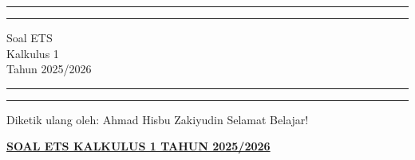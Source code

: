 \documentclass[10pt,openany,a4paper]{article}
\theoremstyle{definition}
\theoremstyle{definition}
\theoremstyle{plain}
\begin{document}
\begin{titlepage}
	\centering %
	\vspace*{1.5\baselineskip} %

	\rule{13cm}{1.6pt}\vspace*{-\baselineskip}\vspace*{2pt} %
	\rule{13cm}{0.4pt} %
	
		\vspace{0.75\baselineskip} %
	{	\Huge Soal ETS\\ 
			\vspace{4mm}
		Kalkulus 1 \\ \vspace{2mm} \huge{Tahun 2025/2026}\\	}
		\vspace{0.75\baselineskip} %
	\rule{13cm}{0.4pt}\vspace*{-\baselineskip}\vspace{3.2pt} %
	\rule{13cm}{1.6pt} %
	
		\vspace{1.75\baselineskip} %
{\large Diketik ulang oleh: Ahmad Hisbu Zakiyudin}
	\vfill
	\vspace{1mm}
\huge{Selamat Belajar!}
\end{titlepage}
\makeatletter
\setlength\fboxsep{3pt}
\setlength{\headheight}{24pt}
 \begin{center}
	{\underline{\textbf{\MakeUppercase{Soal ETS Kalkulus 1 Tahun 2025/2026}}}}
    \end{center}
\end{document}

